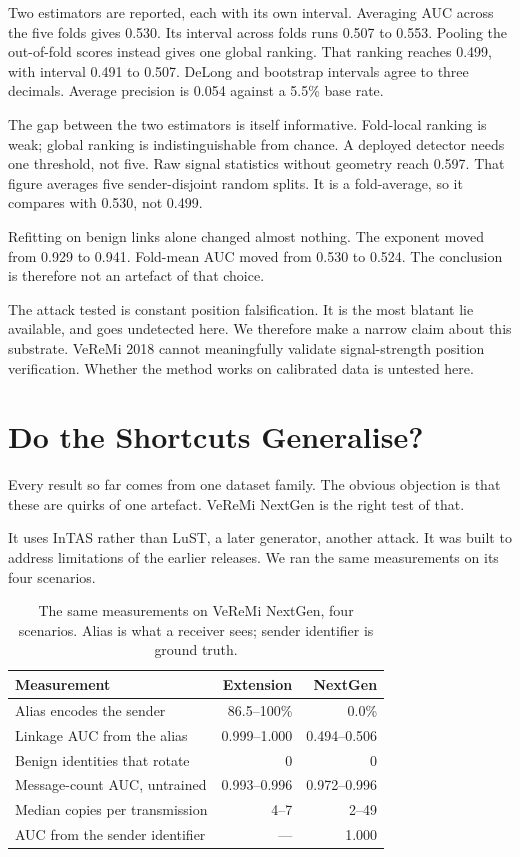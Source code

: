 \documentclass[conference]{IEEEtran}
\begin{document}
Two estimators are reported, each with its own interval.
Averaging AUC across the five folds gives 0.530.
Its interval across folds runs 0.507 to 0.553.
Pooling the out-of-fold scores instead gives one global ranking.
That ranking reaches 0.499, with interval 0.491 to 0.507.
DeLong and bootstrap intervals agree to three decimals.
Average precision is 0.054 against a 5.5\% base rate.

The gap between the two estimators is itself informative.
Fold-local ranking is weak; global ranking is indistinguishable from chance.
A deployed detector needs one threshold, not five.
Raw signal statistics without geometry reach 0.597.
That figure averages five sender-disjoint random splits.
It is a fold-average, so it compares with 0.530, not 0.499.

Refitting on benign links alone changed almost nothing.
The exponent moved from 0.929 to 0.941.
Fold-mean AUC moved from 0.530 to 0.524.
The conclusion is therefore not an artefact of that choice.

The attack tested is constant position falsification.
It is the most blatant lie available, and goes undetected here.
We therefore make a narrow claim about this substrate.
VeReMi 2018 cannot meaningfully validate signal-strength position verification.
Whether the method works on calibrated data is untested here.

\section{Do the Shortcuts Generalise?}
\label{sec:generalise}

Every result so far comes from one dataset family.
The obvious objection is that these are quirks of one artefact.
VeReMi NextGen is the right test of that.

It uses InTAS rather than LuST, a later generator, another attack.
It was built to address limitations of the earlier releases.
We ran the same measurements on its four scenarios.

\begin{table}[t]
\caption{The same measurements on VeReMi NextGen, four scenarios.
Alias is what a receiver sees; sender identifier is ground truth.}
\label{tab:nextgen}
\centering
\footnotesize
\begin{tabular}{@{}lrr@{}}
\toprule
Measurement & Extension & NextGen \\
\midrule
Alias encodes the sender & 86.5--100\% & 0.0\% \\
Linkage AUC from the alias & 0.999--1.000 & 0.494--0.506 \\
Benign identities that rotate & 0 & 0 \\
Message-count AUC, untrained & 0.993--0.996 & 0.972--0.996 \\
Median copies per transmission & 4--7 & 2--49 \\
AUC from the sender identifier & --- & 1.000 \\
\bottomrule
\end{tabular}
\end{table}
\end{document}
